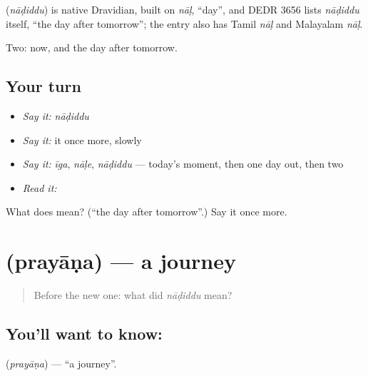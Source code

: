 \begin{cousinweb}
\textbf{} (\emph{nāḍiddu}) is native Dravidian, built on \emph{nāḷ}, \textquotedblleft{}day\textquotedblright{}, and DEDR 3656 lists \emph{nāḍiddu} itself, \textquotedblleft{}the day after tomorrow\textquotedblright{}; the entry also has Tamil \emph{nāḷ} and Malayalam \emph{nāḷ}.
\end{cousinweb}

\begin{grammarlens}[title={What you've built}]
Two: now, and the day after tomorrow.
\end{grammarlens}

\subsection*{Your turn}
\begin{itemize}
\raggedright
  \item \emph{Say it:} \emph{nāḍiddu}
  \item \emph{Say it:} it once more, slowly
  \item \emph{Say it:} \emph{īga}, \emph{nāḷe}, \emph{nāḍiddu} — today's moment, then one day out, then two
  \item \emph{Read it:} \textbf{}
\end{itemize}

\begin{tcolorbox}[breakable,colback=teal!4,colframe=teal!35!black,title={Before you move on}]
What does  mean? (\textquotedblleft{}the day after tomorrow\textquotedblright{}.) Say it once more.
\end{tcolorbox}
\section[\texorpdfstring{\kn{ಪ್ರಯಾಣ} (prayāṇa)}{ಪ್ರಯಾಣ (prayāṇa)}]{ (prayāṇa) — a journey}

\label{lesson:KA-C50-journey}



\begin{quote}
Before the new one: what did \emph{nāḍiddu} mean?
\end{quote}

\subsection*{You'll want to know: }
\textbf{} (\emph{prayāṇa}) — \textquotedblleft{}a journey\textquotedblright{}.

